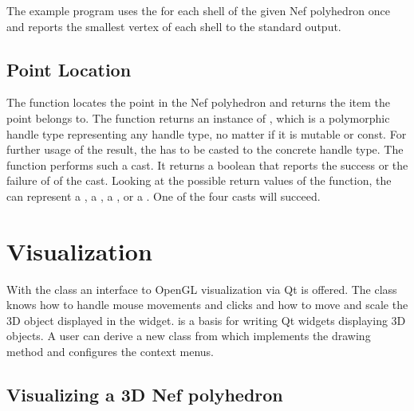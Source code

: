 The example program uses the  for each shell of
the given Nef polyhedron once and reports the smallest vertex of each
shell to the standard output.

\subsection{Point Location}

The  function locates the point  in the
Nef polyhedron and returns the item the point belongs to. The
 function returns an instance of ,
which is a polymorphic handle type representing any handle type, no
matter if it is mutable or const.  For further usage of the result,
the  has to be casted to the concrete handle type.
The  function performs such a cast. It returns a
boolean that reports the success or the failure of of the cast.
Looking at the possible return values of the  function,
the  can represent a , a
, a , or a
. One of the four casts will succeed.


\section{Visualization}

With the  class an interface to OpenGL
visualization via Qt is offered. The class knows how to handle
mouse movements and clicks and how to move and scale the 
3D object displayed in the widget.  is
a basis for writing Qt widgets displaying 3D objects. 
A user can derive a new class from  
which implements the drawing method and configures the context menus.

\subsection{Visualizing a 3D Nef polyhedron}

